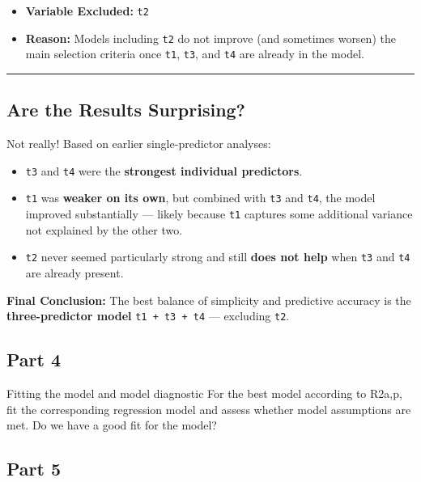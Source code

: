 \documentclass[
]{article}
\providecommand{\tightlist}{%
  \setlength{\itemsep}{0pt}\setlength{\parskip}{0pt}}
\begin{document}
\begin{itemize}
\tightlist
\item
  \textbf{Variable Excluded:} \texttt{t2}
\item
  \textbf{Reason:} Models including \texttt{t2} do not improve (and
  sometimes worsen) the main selection criteria once \texttt{t1},
  \texttt{t3}, and \texttt{t4} are already in the model.
\end{itemize}

\begin{center}\rule{0.5\linewidth}{0.5pt}\end{center}

\subsection{Are the Results
Surprising?}\label{are-the-results-surprising}

Not really! Based on earlier single-predictor analyses:

\begin{itemize}
\tightlist
\item
  \texttt{t3} and \texttt{t4} were the \textbf{strongest individual
  predictors}.
\item
  \texttt{t1} was \textbf{weaker on its own}, but combined with
  \texttt{t3} and \texttt{t4}, the model improved substantially ---
  likely because \texttt{t1} captures some additional variance not
  explained by the other two.
\item
  \texttt{t2} never seemed particularly strong and still \textbf{does
  not help} when \texttt{t3} and \texttt{t4} are already present.
\end{itemize}

\textbf{Final Conclusion:} The best balance of simplicity and predictive
accuracy is the \textbf{three-predictor model} \texttt{t1\ +\ t3\ +\ t4}
--- excluding \texttt{t2}.

\subsection{Part 4}\label{part-4}

Fitting the model and model diagnostic For the best model according to
R2a,p, fit the corresponding regression model and assess whether model
assumptions are met. Do we have a good fit for the model?

\subsection{Part 5}\label{part-5}
\end{document}
